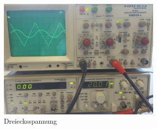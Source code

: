 \begin{figure}
    \centering
    \includegraphics[height=6cm]{data/d_dreieck}
    \caption{Dreiecksspannung}
    \label{fig:dreieck}
\end{figure}

